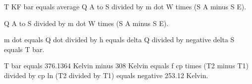 T KF bar equals average Q A to S divided by m dot W times (S A minus S E).  

Q A to S divided by m dot W times (S A minus S E).  

m dot equals Q dot divided by h equals delta Q divided by negative delta S equals T bar.  

T bar equals 376.1364 Kelvin minus 308 Kelvin equals f cp times (T2 minus T1) divided by cp ln (T2 divided by T1) equals negative 253.12 Kelvin.